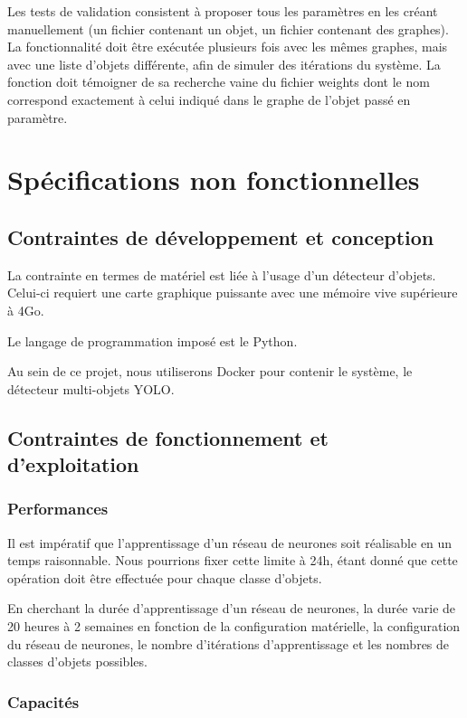 \documentclass[debug,nodate,hideweeklyreports]{polytech/polytech}
\begin{document}
Les tests de validation consistent à proposer tous les paramètres en les créant manuellement (un fichier contenant un objet, un fichier contenant des graphes). La fonctionnalité doit être exécutée plusieurs fois avec les mêmes graphes, mais avec une liste d'objets différente, afin de simuler des itérations du système. La fonction doit témoigner de sa recherche vaine du fichier weights dont le nom correspond exactement à celui indiqué dans le graphe de l'objet passé en paramètre.

\chapter{Spécifications non fonctionnelles}
\label{ann:chap3}

\section{Contraintes de développement et conception}

La contrainte en termes de matériel est liée à l’usage d’un détecteur d’objets. Celui-ci requiert une carte graphique puissante avec une mémoire vive supérieure à 4Go.

Le langage de programmation imposé est le Python.

Au sein de ce projet, nous utiliserons Docker pour contenir le système, le détecteur multi-objets YOLO. 

\section{Contraintes de fonctionnement et d’exploitation}

\subsection{Performances}

Il est impératif que l’apprentissage d’un réseau de neurones soit réalisable en un temps raisonnable. Nous pourrions fixer cette limite à 24h, étant donné que cette opération doit être effectuée pour chaque classe d’objets.

En cherchant la durée d’apprentissage d’un réseau de neurones, la durée varie de 20 heures à 2 semaines en fonction de la configuration matérielle, la configuration du réseau de neurones, le nombre d’itérations d’apprentissage et les nombres de classes d’objets possibles.

\subsection{Capacités}
\end{document}
